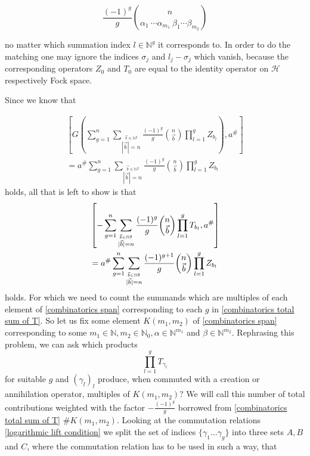 \documentclass[b5paper,draft,openbib,12pt]{memoir}
\begin{document}
\begin{equation}
\frac{(-1)^g}{g} \binom{n}{\alpha_1 \ \cdots \alpha_{m_1} \ \beta_1 \cdots \beta_{m_2}}
\end{equation}

no matter which summation index \(l\in\mathbb{N}^g\) it corresponds to. In order
to do the matching one may ignore the indices \(\sigma_j\) and \(l_j-\sigma_j\) 
which vanish, because the corresponding operators \(Z_0\) and \(T_0\) are equal to
the identity operator on \(\mathcal{H}\) respectively Fock space. 

Since we know that 

\begin{align*}
\left[ G\left(\sum_{g=1}^n \sum_{\stackrel{\vec{b}\in\mathbb{N}^g}{|\vec{b}|=n}}\frac{(-1)^g}{g} 
\binom{n}{\vec{b}}  \prod_{l=1}^g Z_{b_l}\right), a^\#\right]\\
= a^\# \sum_{g=1}^n \sum_{\stackrel{\vec{b}\in\mathbb{N}^g}{|\vec{b}|=n}}\frac{(-1)^g}{g} 
\binom{n}{\vec{b}}  \prod_{l=1}^g Z_{b_l}
\end{align*}
holds, all that is left to show is that 
\begin{align}\label{combinatorics total commutator}
&\left[-\sum_{g=1}^n \sum_{\stackrel{\vec{b}\in\mathbb{N}^g}{|\vec{b}|=n}}\frac{(-1)^g}{g} 
\binom{n}{\vec{b}} \prod_{l=1}^g T_{b_l}, a^\#\right]\\\notag
&= a^\# \sum_{g=1}^n \sum_{\stackrel{\vec{b}\in\mathbb{N}^g}{|\vec{b}|=n}}\frac{(-1)^{g+1}}{g} 
\binom{n}{\vec{b}}  \prod_{l=1}^g Z_{b_l}
\end{align}
holds. For which we need to count the summands which are multiples of each element of \eqref{combinatorics span}
 corresponding to each \(g\) in \eqref{combinatorics total sum of T}. So let us fix some element
 \(K(m_1,m_2)\) of \eqref{combinatorics span} corresponding to some \(m_1\in\mathbb{N},
 m_2\in\mathbb{N}_0, \alpha \in \mathbb{N}^{m_1}\) and \( \beta\in \mathbb{N}^{m_2}\).
Rephrasing this problem, we can ask which products
\begin{equation}
\prod_{l=1}^g T_{\gamma_l}
\end{equation}
 for suitable \(g\) and \((\gamma_l)_l\) produce, when commuted with a creation or annihilation operator, 
  multiples of \(K(m_1,m_2)\)? We will call this number of 
 total contributions weighted with the factor 
 \( - \frac{(-1)^g}{g}\) borrowed from \eqref{combinatorics total sum of T} \(\#K(m_1,m_2)\).  
 Looking at the commutation relations 
\eqref{logarithmic lift condition} we split the set of indices \(\{\gamma_1\dots \gamma_g\}\) into
three sets \(A,B\) and \(C\), where the commutation relation has to be used in such a way, that
\end{document}
